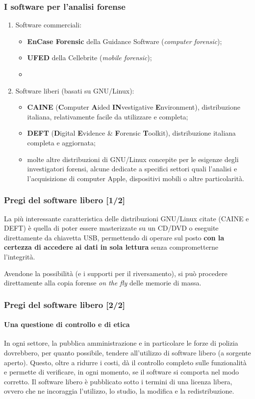 \documentclass[11pt]{beamer}
\begin{document}
	\begin{frame}
		\frametitle{I software per l'analisi forense}
		\begin{enumerate}
			\item Software commerciali:
			\begin{itemize}
				\item \textbf{EnCase Forensic} della Guidance Software (\textit{computer forensic});
				\item \textbf{UFED} della Cellebrite (\textit{mobile forensic});
				\item \textellipsis
			\end{itemize}
			\item Software liberi (basati su GNU/Linux):
			\begin{itemize}
				\item \textbf{CAINE} (\textbf{C}omputer \textbf{A}ided \textbf{IN}vestigative \textbf{E}nvironment), distribuzione italiana, relativamente facile da utilizzare e completa;
				\item \textbf{DEFT} (\textbf{D}igital \textbf{E}vidence \& \textbf{F}orensic \textbf{T}oolkit), distribuzione italiana completa e aggiornata;
				\item molte altre distribuzioni di GNU/Linux concepite per le esigenze degli investigatori forensi, alcune dedicate a specifici settori quali l'analisi e l'acquisizione di computer Apple, dispositivi mobili o altre particolarità.
			\end{itemize}
		\end{enumerate}
	\end{frame}
	
	
	\begin{frame}
		\frametitle{Pregi del software libero [1/2]}
		La più interessante caratteristica delle distribuzioni GNU/Linux citate (CAINE e DEFT) è quella di poter essere masterizzate su un CD/DVD o eseguite direttamente da chiavetta USB, permettendo di operare sul posto \textbf{con la certezza di accedere ai dati in sola lettura} senza comprometterne l'integrità. 
		
		Avendone la possibilità (e i supporti per il riversamento), si può procedere direttamente alla copia forense \textit{on the fly} delle memorie di massa.
		
	\end{frame}
	
	\begin{frame}
		\frametitle{Pregi del software libero [2/2]}
		\framesubtitle{Una questione di controllo e di etica}
		
		In ogni settore, la pubblica amministrazione e in particolare le forze di polizia dovrebbero, per quanto possibile, tendere all'utilizzo di software libero (a sorgente aperto).
		\vfill
		Questo, oltre a ridurre i costi, dà il controllo completo sulle funzionalità e permette di verificare, in ogni momento, se il software si comporta nel modo corretto.
		\vfill
		Il software libero è pubblicato sotto i termini di una licenza libera, ovvero che ne incoraggia l'utilizzo, lo studio, la modifica e la redistribuzione.
		
	\end{frame}
	
\end{document}
